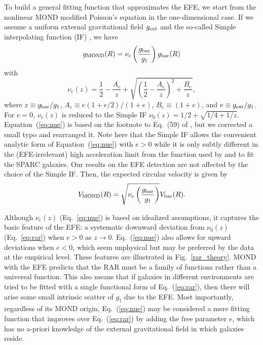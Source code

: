 \documentclass[twocolumn,tighten]{aastex63}
\begin{document}
To build a general fitting function that approximates the EFE, we start from the nonlinear MOND modified Poisson's equation \citep{BM84} in the one-dimensional case. If we assume a uniform external gravitational field $g_{\rm ext} $\citep{FM12} and the so-called Simple interpolating function (IF) \citep{FB05}, we have
\begin{equation}
g_{\rm MOND}(R) = \nu_e\left( \frac{g_{\rm bar}}{g_\dagger} \right) g_{\rm bar}(R)
  \label{eq:rare}
\end{equation}
with
\begin{equation}
  \nu_e(z) = \frac{1}{2}- \frac{A_e }{z} + \sqrt{\left(\frac{1}{2}- \frac{A_e}{z}\right)^2 +  \frac{B_e}{z}},
  \label{eq:nue}
\end{equation}  
where $z \equiv g_{\rm bar}/g_\dagger$, $A_e \equiv e(1+e/2)/(1+e)$, $B_e\equiv(1+e)$, and $e \equiv g_{\rm ext}/g_\dagger$. For $e=0$, $\nu_e(z)$ is reduced to the Simple IF $\nu_0(z) = 1/2 + \sqrt{1/4+1/z}$. Equation~(\ref{eq:nue}) is based on the footnote to Eq.\ (59) of \cite{FM12}, but we corrected a small typo and rearranged it.  Note here that the Simple IF allows the convenient analytic form of Equation~(\ref{eq:nue}) with $e>0$ while it is only subtly different \citep{Chae19} in the (EFE-irrelevant) high acceleration limit from the function used by \cite{MLS} and \cite{Lel17} to fit the SPARC galaxies. Our results on the EFE detection are not affected by the choice of the Simple IF. Then, the expected circular velocity is given by
\begin{equation}
V_{\rm MOND}(R)=\sqrt{\nu_e\left( \frac{g_{\rm bar}}{g_\dagger} \right)} V_{\rm bar}(R).
\label{eq:Vtot}
\end{equation}

Although $\nu_e(z)$ (Eq.~\ref{eq:nue}) is based on idealized assumptions, it captures the basic feature of the EFE: a systematic downward deviation from $\nu_0(z)$ (Eq.~\ref{eq:rar}) when $e>0$ as $z \rightarrow 0$. Eq.~(\ref{eq:nue}) also allows for upward deviations when $e<0$, which seem unphysical but may be preferred by the data at the empirical level. These features are illustrated in Fig.~\ref{rar_theory}. MOND with the EFE predicts that the RAR must be a family of functions rather than a universal function. This also means that if galaxies in different environments are tried to be fitted with a single functional form of Eq.~(\ref{eq:rar}), then there will arise some small intrinsic scatter of $g_\dagger$ due to the EFE.  Most importantly, regardless of its MOND origin, Eq.~(\ref{eq:nue}) may be considered a mere fitting function that improves over Eq.~(\ref{eq:rar}) by adding the free parameter $e$, which has no a-priori knowledge of the external gravitational field in which galaxies reside.
\end{document}
